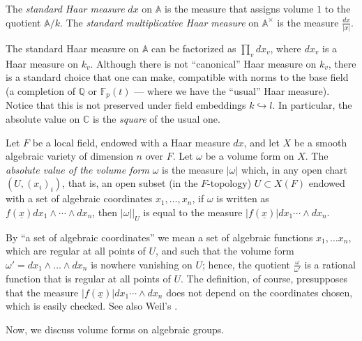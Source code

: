 \begin{definition}
 \label{definition-standard-Haar}
The {\it standard Haar measure} $dx$ on $\mathbb A$ is the measure that assigns volume $1$ to the quotient $\mathbb A/k$. The {\it standard multiplicative Haar measure} on $\mathbb A^\times$ is the measure $\frac{dx}{|x|}$. 
\end{definition}

\begin{remark}
 \label{remark-absolute-value}
The standard Haar measure on $\mathbb A$ can be factorized as $\prod_v dx_v$, where $dx_v$ is a Haar measure on $k_v$. Although there is not ``canonical'' Haar measure on $k_v$, there is a standard choice that one can make, compatible with norms to the base field (a completion of $\mathbb Q$ or $\mathbb F_p(t)$ --- where we have the ``usual'' Haar measure). Notice that this is not preserved under field embeddings $k\hookrightarrow l$. In particular, the absolute value on $\mathbb C$ is the \emph{square} of the usual one.
\end{remark}



\begin{definition}
 \label{definition-absolute-value-measure}
Let $F$ be a local field, endowed with a Haar measure $dx$, and let $X$ be a smooth algebraic variety of dimension $n$ over $F$. Let $\omega$ be a volume form on $X$. The {\it absolute value of the volume form} $\omega$ is the measure $|\omega|$ which, in any open chart $(U ,(x_i)_i)$, that is, an open subset (in the $F$-topology) $U\subset X(F)$ endowed with a set of algebraic coordinates $x_1, \dots, x_n$, if $\omega$ is written as $f(\underline x) dx_1 \wedge \cdots \wedge dx_n$, then $\left. |\omega| \right|_{U}$ is equal to the measure $|f(\underline x)| dx_1 \cdots \wedge dx_n$.
\end{definition}

By ``a set of algebraic coordinates'' we mean a set of algebraic functions $x_1, \dots x_n$, which are regular at all points of $U$, and such that the volume form $\omega'=dx_1 \wedge \dots \wedge dx_n$ is nowhere vanishing on $U$; hence, the quotient $\frac{\omega}{\omega'}$ is a rational function that is regular at all points of $U$. The definition, of course, presupposes that the measure $|f(\underline x)| dx_1 \cdots \wedge dx_n$ does not depend on the coordinates chosen, which is easily checked. See also Weil's \cite{Weil-adeles}.

Now, we discuss volume forms on algebraic groups.


